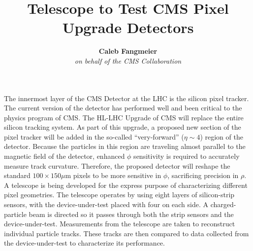 \documentclass[final]{beamer}
\title{Telescope to Test CMS Pixel Upgrade Detectors} %
\author{\textbf{Caleb Fangmeier} \\
  \textit{on behalf of the CMS Collaboration}} %
\institute{Department of Physics \& Astronomy \\ \textit{University of Nebraska \-- Lincoln}} %
\begin{document}

\setlength{\belowcaptionskip}{2ex} %
\setlength\belowdisplayshortskip{2ex} %

\begin{frame}[t] %
  \small
  The innermost layer of the CMS Detector at the LHC is the silicon pixel tracker. The current version of the detector has performed well and been critical to the physics program of CMS\@.  The HL-LHC Upgrade of CMS will replace the entire silicon tracking system.  As part of this upgrade, a proposed new section of the pixel tracker will be added in the so-called ``very-forward'' ($\eta\sim4$) region of the detector. Because the particles in this region are traveling almost parallel to the magnetic field of the detector, enhanced $\phi$ sensitivity is required to accurately measure track curvature. Therefore, the proposed detector will reshape the standard $100\times150\mu\text{m}$ pixels to be more sensitive in $\phi$, sacrificing precision in $\rho$. A telescope is being developed for the express purpose of characterizing different pixel geometries.  The telescope operates by using eight layers of silicon-strip sensors, with the device-under-test placed with four on each side. A charged-particle beam is directed so it passes through both the strip sensors and the device-under-test. Measurements from the telescope are taken to reconstruct individual particle tracks. These tracks are then compared to data collected from the device-under-test to characterize its performance.
  
\vspace{.2in}


\end{frame}
\end{document}

